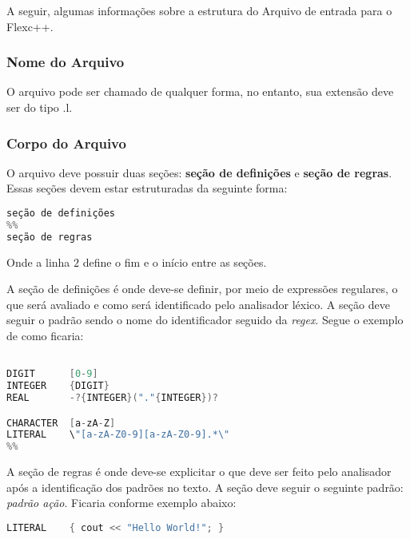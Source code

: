 \begin{apendicesenv}
A seguir, algumas informações sobre a estrutura do Arquivo de entrada para o Flexc++.

\subsubsection{Nome do Arquivo}

O arquivo pode ser chamado de qualquer forma, no entanto, sua extensão deve ser do tipo .l.

\subsubsection{Corpo do Arquivo}

O arquivo deve possuir duas seções: \textbf{seção de definições} e \textbf{seção de regras}. Essas seções devem estar estruturadas da seguinte forma:

\begin{lstlisting}[language=c, label=apendiceCodigoFlex2, caption=Corpo do Arquivo do Flec++]
seção de definições
%%
seção de regras
\end{lstlisting}
\par
\indent Onde a linha $2$ define o fim e o início entre as seções.


A seção de definições é onde deve-se definir, por meio de expressões regulares, o que será avaliado e como será identificado pelo analisador léxico. A seção deve seguir o padrão sendo o nome do identificador seguido da \textit{regex}. Segue o exemplo de como ficaria:

\begin{lstlisting}[language=c, label=apendiceCodigoFlex3, caption=Seção de Definições]

DIGIT      [0-9]
INTEGER    {DIGIT}
REAL       -?{INTEGER}("."{INTEGER})?

CHARACTER  [a-zA-Z]
LITERAL    \"[a-zA-Z0-9][a-zA-Z0-9].*\"
%%
\end{lstlisting}


A seção de regras é onde deve-se explicitar o que deve ser feito pelo analisador após a identificação dos padrões no texto. A seção deve seguir o seguinte padrão: \textit{padrão    ação}. Ficaria conforme exemplo abaixo:

\begin{lstlisting}[language=c, label=apendiceCodigoFlex4, caption=Seção de Regras]
%%
LITERAL    { cout << "Hello World!"; }
\end{lstlisting}


\end{apendicesenv}
